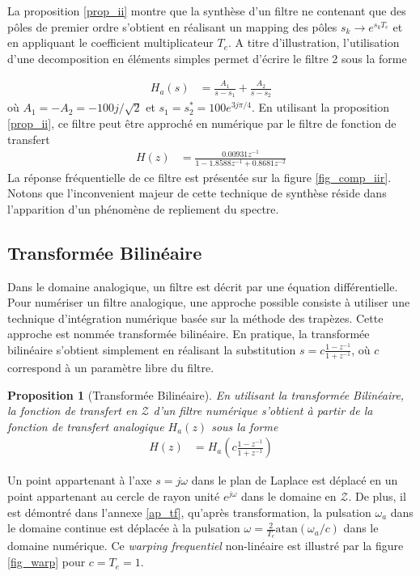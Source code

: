 \documentclass[11pt,a4paper]{IEEEtran}
\newtheorem{proposition}{Proposition}
\begin{document}
La proposition \ref{prop_ii} montre que la synthèse d'un filtre ne contenant que des pôles de premier ordre s'obtient en réalisant un mapping des pôles $s_k \to e^{s_kT_e}$ et en appliquant le coefficient multiplicateur $T_e$. A titre d'illustration, l'utilisation d'une decomposition en éléments simples permet d'écrire le filtre 2 sous la forme

\begin{align*}
H_a(s)&=\frac{A_1}{s-s_1}+\frac{A_2}{s-s_2}
\end{align*}
où $A_1=-A_2=-100j/\sqrt{2}$ et $s_1=s_2^*=100e^{3j\pi/4}$. En utilisant la proposition \ref{prop_ii}, ce filtre peut être approché en numérique par le filtre de fonction de transfert
\begin{align*}
H(z)&=\frac{0.00931z^{-1}}{1-1.8588z^{-1}+0.8681z^{-2}}
\end{align*}
La réponse fréquentielle de ce filtre est présentée sur la figure \ref{fig_comp_iir}. Notons que l'inconvenient majeur de cette technique de synthèse réside dans l'apparition d'un phénomène de repliement du spectre.

\subsection{Transformée Bilinéaire}
Dans le domaine analogique, un filtre est décrit par une équation différentielle. Pour numériser un filtre analogique, une approche possible consiste à utiliser une technique d'intégration numérique basée sur la méthode des trapèzes. Cette approche est nommée transformée bilinéaire. En pratique, la transformée bilinéaire s'obtient simplement en réalisant la substitution $s=c\frac{1-z^{-1}}{1+z^{-1}}$, où $c$ correspond à un paramètre libre du filtre. 

\begin{proposition}[Transformée Bilinéaire] En utilisant la transformée Bilinéaire, la fonction de transfert en $\mathcal{Z}$ d'un filtre numérique s'obtient à partir de la fonction de transfert analogique $H_a(z)$ sous la forme
\begin{align}
H(z)&=H_a\left(c\frac{1-z^{-1}}{1+z^{-1}}\right)
\end{align}
\end{proposition}
Un point appartenant à l'axe $s=j\omega$ dans le plan de Laplace est déplacé en un point appartenant au cercle de rayon unité $e^{j\omega}$ dans le domaine en $\mathcal{Z}$. De plus, il est démontré dans l'annexe \ref{ap_tf}, qu'après transformation, la pulsation $\omega_a$ dans le domaine continue est déplacée à la pulsation $\omega=\frac{2}{T_e}\textrm{atan}(\omega_a/c)$ dans le domaine numérique. Ce \textit{warping frequentiel} non-linéaire est illustré par la figure \ref{fig_warp} pour $c=T_e=1$. 
\end{document}
